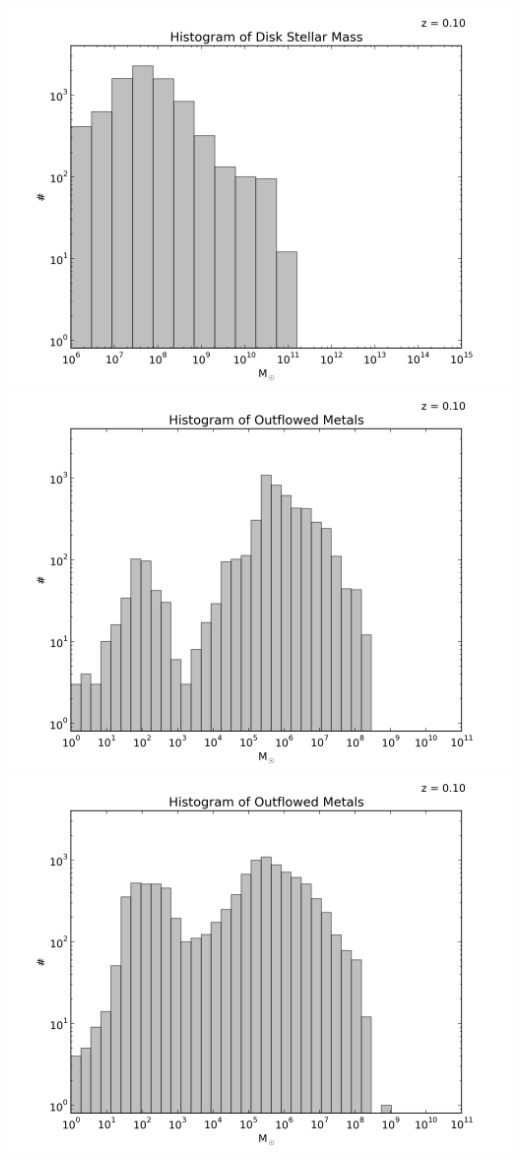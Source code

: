 \documentclass[a4paper,11pt,fleqn,oneside]{book}
\begin{document}
\begin{itemize}
\includegraphics[scale=0.5]{analysis/galacticus/histograms/Histogram_of_Disk_Stellar_Massgalacticus_nestages_SLtest2_0000.png} \\
\includegraphics[scale=0.5]{analysis/galacticus/histograms/Histogram_of_Outflowed_Metalsgalacticus_nestages12_0000.png} \\
\includegraphics[scale=0.5]{analysis/galacticus/histograms/Histogram_of_Outflowed_Metalsgalacticus_nestages12SLtest_0000.png} \\

\end{itemize}
\end{document}
